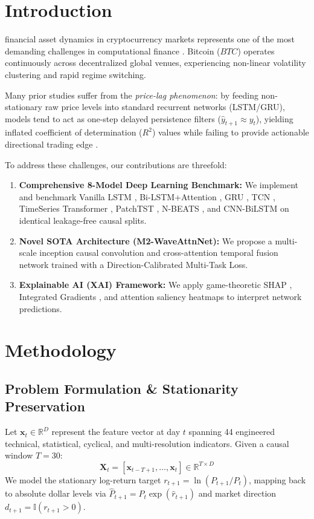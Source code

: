 \documentclass[journal]{IEEEtran}
\begin{document}
\section{Introduction}
 financial asset dynamics in cryptocurrency markets represents one of the most demanding challenges in computational finance \cite{lim2021temporal}. Bitcoin ($BTC$) operates continuously across decentralized global venues, experiencing non-linear volatility clustering and rapid regime switching.

Many prior studies suffer from the \textit{price-lag phenomenon}: by feeding non-stationary raw price levels into standard recurrent networks (LSTM/GRU), models tend to act as one-step delayed persistence filters ($\hat{y}_{t+1} \approx y_t$), yielding inflated coefficient of determination ($R^2$) values while failing to provide actionable directional trading edge \cite{bai2018empirical}.

To address these challenges, our contributions are threefold:
\begin{enumerate}
    \item \textbf{Comprehensive 8-Model Deep Learning Benchmark:} We implement and benchmark Vanilla LSTM \cite{hochreiter1997long}, Bi-LSTM+Attention \cite{bahdanau2014neural}, GRU \cite{cho2014learning}, TCN \cite{bai2018empirical}, TimeSeries Transformer \cite{vaswani2017attention}, PatchTST \cite{nie2023patchtst}, N-BEATS \cite{oreshkin2020nbeats}, and CNN-BiLSTM on identical leakage-free causal splits.
    \item \textbf{Novel SOTA Architecture (M2-WaveAttnNet):} We propose a multi-scale inception causal convolution and cross-attention temporal fusion network trained with a Direction-Calibrated Multi-Task Loss.
    \item \textbf{Explainable AI (XAI) Framework:} We apply game-theoretic SHAP \cite{lundberg2017unified}, Integrated Gradients \cite{sundararajan2017axiomatic}, and attention saliency heatmaps to interpret network predictions.
\end{enumerate}

\section{Methodology}

\subsection{Problem Formulation \& Stationarity Preservation}
Let $\mathbf{x}_t \in \mathbb{R}^D$ represent the feature vector at day $t$ spanning 44 engineered technical, statistical, cyclical, and multi-resolution indicators. Given a causal window $T=30$:
\begin{equation}
\mathbf{X}_t = [\mathbf{x}_{t-T+1}, \dots, \mathbf{x}_t] \in \mathbb{R}^{T \times D}
\end{equation}
We model the stationary log-return target $r_{t+1} = \ln(P_{t+1}/P_t)$, mapping back to absolute dollar levels via $\hat{P}_{t+1} = P_t \exp(\hat{r}_{t+1})$ and market direction $d_{t+1} = \mathbb{I}(r_{t+1} > 0)$.
\end{document}
